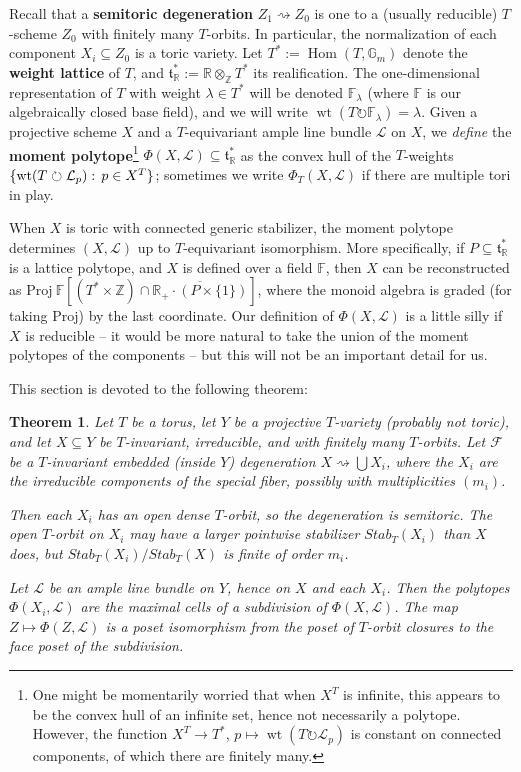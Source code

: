 \documentclass[10pt,a4paper]{amsart}
\newtheorem{theorem}[Thm]{Theorem}
\DeclareMathOperator{\wt}{wt}
\DeclareMathOperator{\Hom}{Hom}
\newcommand{\RR}{\mathbb{R}}
\newcommand{\ZZ}{\mathbb{Z}}
\newcommand\defn[1]{{\bf #1}}
\newcommand\Union\bigcup
\newcommand\lie[1]{{\mathfrak #1}}
\newcommand\FF{{\mathbb F}}
\newcommand\tensor\otimes
\newcommand\calF{{\mathcal F}}
\newcommand\calL{{\mathcal L}}
\newcommand\Gm{{\mathbb G}_m}
\newcommand\actson\circlearrowright
\renewcommand{\colon}{\mathrel{:}}
\renewcommand{\colon}{:\mkern\thinmuskip}
\begin{document}
Recall that a \defn{semitoric degeneration} $Z_1 \rightsquigarrow Z_0$
is one to a (usually reducible) $T$-scheme $Z_0$ with finitely many $T$-orbits.
In particular, the normalization of each component $X_i \subseteq Z_0$
is a toric variety.
Let $T^* := \Hom(T,\Gm)$ denote the \defn{weight lattice} of $T$,
and $\lie t_\RR^* := \RR \tensor_\ZZ T^*$ its realification.
The one-dimensional representation of $T$ with weight $\lambda \in T^*$
will be denoted $\FF_\lambda$ (where $\FF$ is our algebraically closed
base field), and we will write $\wt(T\actson \FF_\lambda) = \lambda$.
Given a projective scheme $X$ and a $T$-equivariant ample line bundle
$\calL$ on $X$, we {\em define} the \defn{moment polytope}\footnote{%
  One might be momentarily worried that when $X^T$ is infinite, this appears to be
  the convex hull of an infinite set, hence not necessarily a polytope.
  However, the function $X^T \to T^*$, $p \mapsto \wt(T \actson \calL_p)$
  is constant on connected components, of which there are finitely many.}
$\Phi(X,\calL) \subseteq \lie t_\RR^*$ as the convex hull of the $T$-weights
$\{\wt(T \actson \calL_p) \colon p\in X^T\}$;
sometimes we write $\Phi_T(X,\calL)$ if there are multiple tori in play.

When $X$ is toric with connected generic stabilizer, the moment polytope
determines $(X,\calL)$ up to $T$-equivariant isomorphism. More specifically,
if $P \subseteq \lie t_\RR^*$ is a lattice polytope, and $X$ is defined
over a field $\FF$, then $X$ can be reconstructed as
${\mathrm {Proj}}\
\FF\left[(T^* \times \ZZ) \cap \overline{\RR_+\cdot (P \times \{1\})}\right]$,
where the monoid algebra is graded (for taking $\mathrm{Proj}$) by the last
coordinate. Our definition of $\Phi(X,\calL)$ is a little silly if $X$ is
reducible -- it would be more natural to take the union of the moment polytopes
of the components -- but this will not be an important detail for us.

This section is devoted to the following theorem:


\begin{theorem}\label{thm:subdivision-general}
  Let $T$ be a torus, let $Y$ be a projective $T$-variety (probably not toric),
  and let $X \subseteq Y$ be $T$-invariant, irreducible, and with
  finitely many $T$-orbits.  Let $\calF$ be a $T$-invariant
  embedded (inside $Y$) degeneration $X \rightsquigarrow \Union X_i$,
  where the $X_i$ are the irreducible components of the special fiber,
  possibly with multiplicities $(m_i)$. 
  
  Then each $X_i$ has an open dense $T$-orbit, so the degeneration is semitoric.
  The open $T$-orbit on $X_i$ may have a larger pointwise stabilizer
  $Stab_T(X_i)$ than $X$ does, but $Stab_T(X_i)/Stab_T(X)$ is
  finite of order $m_i$.

  Let $\calL$ be an ample line bundle on $Y$, hence on $X$ and each $X_i$.
  Then the polytopes $\Phi(X_i,\calL)$ are the maximal cells of a
  subdivision of $\Phi(X,\calL)$. The map $Z \mapsto \Phi(Z,\calL)$
  is a poset isomorphism from the poset of $T$-orbit closures to
  the face poset of the subdivision.
\end{theorem}
\end{document}
